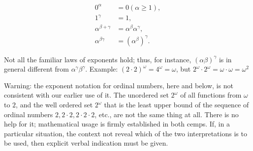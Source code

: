 \begin{align*}
0^{\alpha} &= 0(\alpha \ge 1),\\
1^{\gamma} &= 1,\\
\alpha^{\beta + \gamma} &= \alpha^{\beta} \alpha^{\gamma} ,\\
\alpha^{\beta \gamma} &= (\alpha^{\beta})^{\gamma}.
\end{align*}

Not all the familiar laws of exponents hold; thus, for instance, $( \alpha \beta)^{\gamma}$ is in general different from $\alpha^{\gamma} \beta^{\gamma}$. Example: $(2 \cdot 2)^{\omega} = 4^{\omega} = \omega$, but $2^{\omega} \cdot 2^{\omega} = \omega \cdot \omega =  \omega^{2}$ 

Warning: the exponent notation for ordinal numbers, here and below, is not consistent with our earlier use of it. The unordered set $2^{\omega}$ of all functions from $\omega$ to $2$, and the well ordered set $2^{\omega}$ that is the least upper bound of the sequence of ordinal numbers $2, 2 \cdot 2, 2 \cdot 2 \cdot 2$, etc., are not the same thing at all. There is no help for it; mathematical usage is firmly established in both cemps. If, in a particular situation, the context not reveal which of the two interpretations is to be used, then explicit verbal indication must be given. 